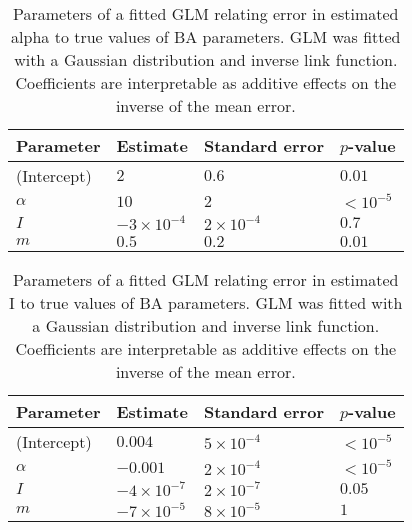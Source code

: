 \begin{table}[ht]
\centering
\begin{tabular}{llll}
  \hline
Parameter & Estimate & Standard error & $p$-value \\ 
  \hline
(Intercept) & $2$ & $0.6$ & $0.01$ \\ 
  $\alpha$ & $10$ & $2$ & ${<}10^{-5}$ \\ 
  $I$ & $-3\!\times\!10^{-4}$ & $2\!\times\!10^{-4}$ & $0.7$ \\ 
  $m$ & $0.5$ & $0.2$ & $0.01$ \\ 
   \hline
\end{tabular}
\caption[Parameters of a fitted \gls{GLM} relating error in estimated \gls{alpha} to true values of \gls{BA} parameters.]{Parameters of a fitted \gls{GLM} relating error in estimated \gls{alpha} to true values of \gls{BA} parameters. \gls{GLM} was fitted with a Gaussian distribution and inverse link function. Coefficients are interpretable as additive effects on the inverse of the mean error.} 
\label{tab:glmalpha}
\end{table}
\begin{table}[ht]
\centering
\begin{tabular}{llll}
  \hline
Parameter & Estimate & Standard error & $p$-value \\ 
  \hline
(Intercept) & $0.004$ & $5\!\times\!10^{-4}$ & ${<}10^{-5}$ \\ 
  $\alpha$ & $-0.001$ & $2\!\times\!10^{-4}$ & ${<}10^{-5}$ \\ 
  $I$ & $-4\!\times\!10^{-7}$ & $2\!\times\!10^{-7}$ & $0.05$ \\ 
  $m$ & $-7\!\times\!10^{-5}$ & $8\!\times\!10^{-5}$ & $1$ \\ 
   \hline
\end{tabular}
\caption[Parameters of a fitted \gls{GLM} relating error in estimated \gls{I} to true values of \gls{BA} parameters.]{Parameters of a fitted \gls{GLM} relating error in estimated \gls{I} to true values of \gls{BA} parameters. GLM was fitted with a Gaussian distribution and inverse link function. Coefficients are interpretable as additive effects on the inverse of the mean error.} 
\label{tab:glmI}
\end{table}




